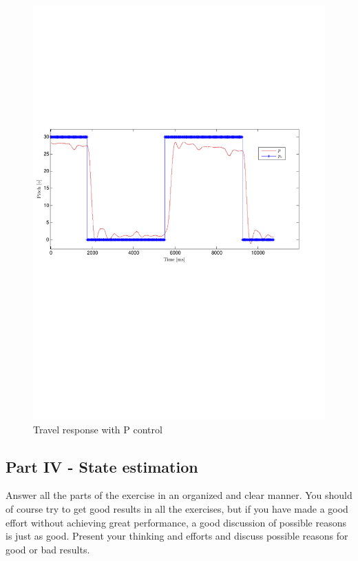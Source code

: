 \begin{figure}[!!ht!!!!!!!!tb!!]
	\centering
		\includegraphics[width=1\textwidth,trim={4cm 9cm 4cm 9cm},clip]{figures/P3p2_p.pdf}
	\caption{Travel response with P control}
\label{fig:P3p2_p}
\end{figure}
\clearpage
\subsection{Part IV - State estimation}









Answer all the parts of the exercise in an organized and clear manner. You should of course try to get good results in all the exercises, but if you have made a good effort without achieving great performance, a good discussion of possible reasons is just as good. Present your thinking and efforts and discuss possible reasons for good or bad results.

